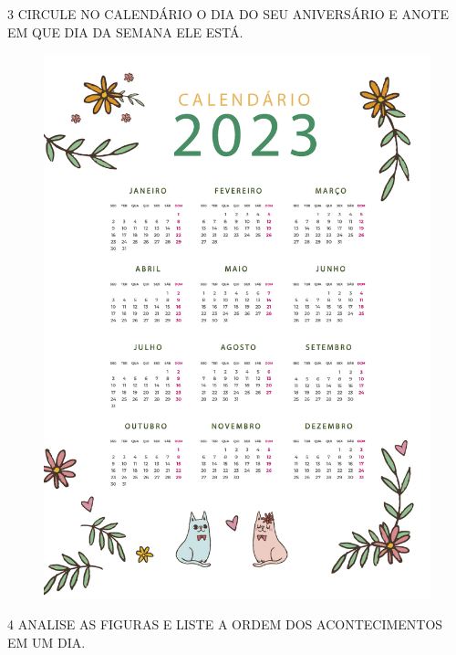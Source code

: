 
\pagebreak
\num{3} CIRCULE NO CALENDÁRIO O DIA DO SEU ANIVERSÁRIO E ANOTE EM QUE DIA DA SEMANA ELE ESTÁ.


\begin{figure}[htpb!]
\centering
\includegraphics[width=.9\textwidth]{./media/SAEB_1ANO_MAT_FIGURA51.png}
\end{figure}


\pagebreak
\num{4} ANALISE AS FIGURAS E LISTE A ORDEM DOS ACONTECIMENTOS EM UM DIA.

